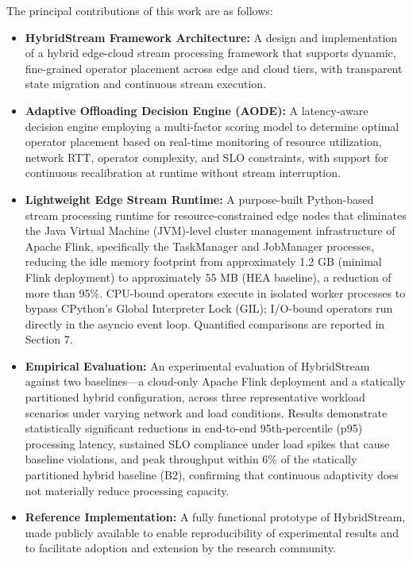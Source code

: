 \documentclass[preprint,review,12pt]{elsarticle}
\providecommand{\tightlist}{\setlength{\itemsep}{0pt}\setlength{\parskip}{0pt}}
\begin{document}
The principal contributions of this work are as follows:

\begin{itemize}
\tightlist
\item
  \textbf{HybridStream Framework Architecture:} A design and implementation of a hybrid edge-cloud stream processing framework that supports dynamic, fine-grained operator placement across edge and cloud tiers, with transparent state migration and continuous stream execution.
\item
  \textbf{Adaptive Offloading Decision Engine (AODE):} A latency-aware decision engine employing a multi-factor scoring model to determine optimal operator placement based on real-time monitoring of resource utilization, network RTT, operator complexity, and SLO constraints, with support for continuous recalibration at runtime without stream interruption.
\item
  \textbf{Lightweight Edge Stream Runtime:} A purpose-built Python-based stream processing runtime for resource-constrained edge nodes that eliminates the Java Virtual Machine (JVM)-level cluster management infrastructure of Apache Flink, specifically the TaskManager and JobManager processes, reducing the idle memory footprint from approximately 1.2 GB (minimal Flink deployment) to approximately 55 MB (HEA baseline), a reduction of more than 95\%. CPU-bound operators execute in isolated worker processes to bypass CPython's Global Interpreter Lock (GIL); I/O-bound operators run directly in the asyncio event loop. Quantified comparisons are reported in Section 7.
\item
  \textbf{Empirical Evaluation:} An experimental evaluation of HybridStream against two baselines—a cloud-only Apache Flink deployment and a statically partitioned hybrid configuration, across three representative workload scenarios under varying network and load conditions. Results demonstrate statistically significant reductions in end-to-end 95th-percentile (p95) processing latency, sustained SLO compliance under load spikes that cause baseline violations, and peak throughput within 6\% of the statically partitioned hybrid baseline (B2), confirming that continuous adaptivity does not materially reduce processing capacity.
\item
  \textbf{Reference Implementation:} A fully functional prototype of HybridStream, made publicly available to enable reproducibility of experimental results and to facilitate adoption and extension by the research community.
\end{itemize}
\end{document}
